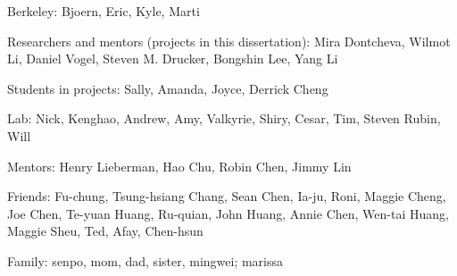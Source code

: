 \begin{acknowledgements}
Berkeley: Bjoern, Eric, Kyle, Marti

Researchers and mentors (projects in this dissertation): Mira Dontcheva, Wilmot Li, Daniel Vogel, Steven M. Drucker, Bongshin Lee, Yang Li

Students in projects: Sally, Amanda, Joyce, Derrick Cheng

Lab: Nick, Kenghao, Andrew, Amy, Valkyrie, Shiry, Cesar, Tim, Steven Rubin, Will

Mentors: Henry Lieberman, Hao Chu, Robin Chen, Jimmy Lin

Friends: Fu-chung, Tsung-hsiang Chang, Sean Chen, Ia-ju, Roni, Maggie Cheng, Joe Chen, Te-yuan Huang, Ru-quian, John Huang, Annie Chen, Wen-tai Huang, Maggie Sheu, Ted, Afay, Chen-hsun

Family: senpo, mom, dad, sister, mingwei; marissa

\end{acknowledgements}
